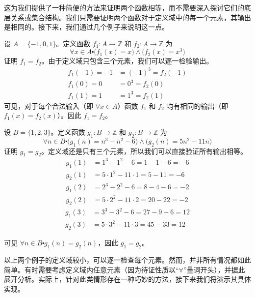 这为我们提供了一种简便的方法来证明两个函数相等，而不需要深入探讨它们的底层关系或集合结构。我们只需要证明两个函数对于定义域中的每一个元素，其输出是相同的。接下来，我们通过几个例子来说明这一点。\\

\begin{example}
    设 $A = \{-1, 0, 1\}$。定义函数 $f_1 : A \to \mathbb{Z}$ 和 $f_2 : A \to \mathbb{Z}$ 为
    \[\forall x \in A \centerdot \big(f_1(x) = x\big) \land \big(f_2(x) = x^3\big)\]
    证明 $f_1 = f_2$。由于定义域只包含三个元素，我们可以逐一检验输出。
    \begin{align*}
        f_1(-1) = -1 &= (-1)^3 = f_2(-1)\\
        f_1(0) = 0 &= 0^3 = f_2(0)\\
        f_1(1) = 1 &= 1^3 = f_2(1)
    \end{align*}
    可见，对于每个合法输入（即 $\forall x \in A$）函数 $f_1$ 和 $f_2$ 均有相同的输出（即 $f_1(x) = f_2(x)$）。因此 $f_1 = f_2$。
\end{example}

\begin{example}
    设 $B = \{1, 2, 3\}$。定义函数 $g_1 : B \to \mathbb{Z}$ 和 $g_2 : B \to \mathbb{Z}$ 为
    \[\forall n \in B \centerdot \big(g_1(n) = n^3-n^2-6\big) \land \big(g_2(n) = 5n^2-11n\big)\]
    证明 $g_1 = g_2$。定义域还是只有三个元素，所以我们可以直接验证所有输出相等。
    \begin{align*}
        g_1(1) &= 1^3 - 1^2 - 6 = 1 - 1 - 6 = -6 \\
        g_2(1) &= 5 \cdot 1^2 - 11 \cdot 1 = 5 - 11 = -6 
   \end{align*}
   \begin{align*}
        g_1(2) &= 2^3 - 2^2 - 6 = 8 - 4 - 6 = -2 \\
        g_2(2) &= 5 \cdot 2^2 - 11 \cdot 2 = 20 - 22 = -2
   \end{align*}
   \begin{align*}
        g_1(3) &= 3^3 - 3^2 - 6 = 27 - 9 - 6 = 12 \\
        g_2(3) &= 5 \cdot 3^2 - 11 \cdot 3 = 45 - 33 = 12
    \end{align*}

    可见 $\forall n \in B \centerdot g_1(n) = g_2(n)$，因此 $g_1 = g_2$。
\end{example}

以上两个例子的定义域较小，可以逐一检查每个元素。然而，并非所有情况都如此简单。有时需要考虑定义域内任意元素（因为待证性质以``$\forall$''量词开头），并据此展开分析。实际上，针对此类情形存在一种巧妙的方法，接下来我们将演示其具体实现。

